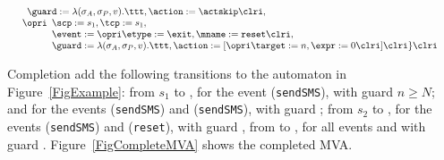 \[{\begin{array}[t]{l}
\begin{array}[t]{l}
\begin{array}[t]{l}
\begin{array}[t]{l}
             \guard := \lambda(\sigma_A, \sigma_P, v). \ttt,
             \action := \actskip
            \clri,
\end{array}\\
\opri
\begin{array}[t]{l}
\scp := s_1, \tcp := s_1, \\
             \event := \opri \etype := \exit, \mname := \texttt{reset}
\clri, \\
             \guard := \lambda(\sigma_A, \sigma_P, v). \ttt,
             \action := [\opri \target := n, \expr := 0 \clri]
           \clri \} \clri
\end{array}
\end{array}
\end{array}\\
\end{array}
}\]

Completion add the following transitions to the automaton in
Figure~\ref{FigExample}: from \(s_1\) to \halted, for the event
\entry(\texttt{sendSMS}), with guard \(n \geq N\); and for the events
\exit(\texttt{sendSMS}) and \excexit(\texttt{sendSMS}), with guard \ttt;
from \(s_2\) to \halted, for the events \entry(\texttt{sendSMS}) and
\exit(\texttt{reset}), with guard \ttt, from \halted to \halted, for
all events and with guard \ttt.  Figure~\ref{FigCompleteMVA} shows
the completed MVA.


